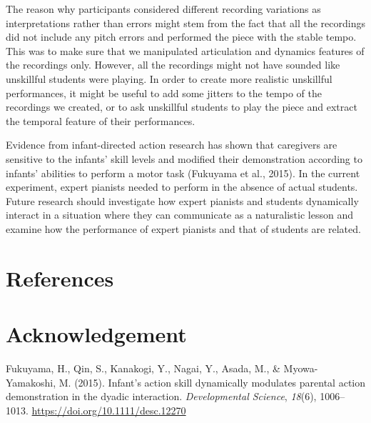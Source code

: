 \documentclass[
  man]{apa6}
\newlength{\cslhangindent}
\newlength{\cslentryspacingunit} %
\newenvironment{CSLReferences}[2] %
 {%
  \setlength{\parindent}{0pt}
  \ifodd #1
  \let\oldpar\par
  \def\par{\hangindent=\cslhangindent\oldpar}
  \fi
  \setlength{\parskip}{#2\cslentryspacingunit}
 }%
 {}
\begin{document}
The reason why participants considered different recording variations as interpretations rather than errors might stem from the fact that all the recordings did not include any pitch errors and performed the piece with the stable tempo. This was to make sure that we manipulated articulation and dynamics features of the recordings only. However, all the recordings might not have sounded like unskillful students were playing. In order to create more realistic unskillful performances, it might be useful to add some jitters to the tempo of the recordings we created, or to ask unskillful students to play the piece and extract the temporal feature of their performances.

Evidence from infant-directed action research has shown that caregivers are sensitive to the infants' skill levels and modified their demonstration according to infants' abilities to perform a motor task (Fukuyama et al., 2015). In the current experiment, expert pianists needed to perform in the absence of actual students. Future research should investigate how expert pianists and students dynamically interact in a situation where they can communicate as a naturalistic lesson and examine how the performance of expert pianists and that of students are related.

\hypertarget{references}{%
\section{References}\label{references}}

\hypertarget{acknowledgement}{%
\section*{Acknowledgement}\label{acknowledgement}}

\hypertarget{refs}{}
\begin{CSLReferences}{1}{0}
\leavevmode{}%
Fukuyama, H., Qin, S., Kanakogi, Y., Nagai, Y., Asada, M., \& Myowa-Yamakoshi, M. (2015). Infant's action skill dynamically modulates parental action demonstration in the dyadic interaction. \emph{Developmental Science}, \emph{18}(6), 1006--1013. \url{https://doi.org/10.1111/desc.12270}

\end{CSLReferences}
\end{document}
